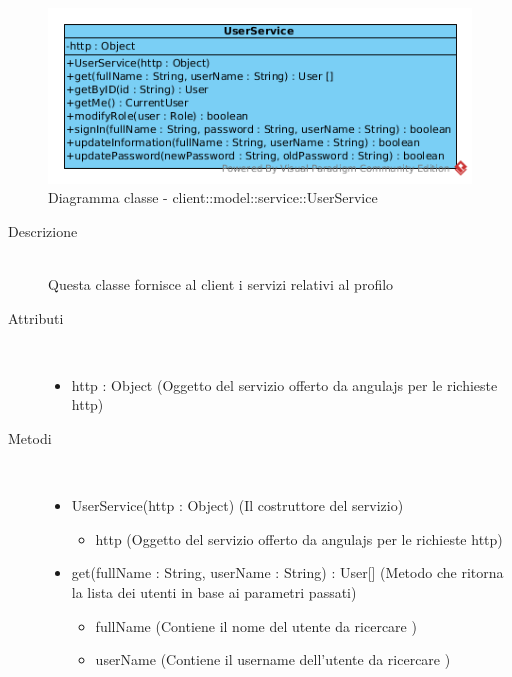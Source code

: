 \vspace{0.5cm}
\hypertarget{client::model::service::UserService}{}
\begin{center}
			\begin{figure}[H]
				\centering \includegraphics[scale=4, max width=\textwidth, max height=\myheight]{../img/diagrammiClassi/client/model/service/UserService.png}
				\caption{Diagramma classe - client::model::service::UserService}
			\end{figure}
		\end{center}\begin{description}
\item[Descrizione] \hfill \\
 Questa classe fornisce al client i servizi relativi al profilo 
\item[Attributi] \hfill \\
 \vspace{-7mm}
\begin{itemize}
\item http : Object (Oggetto del servizio offerto da angulajs per le richieste http)
\end{itemize}

\item[Metodi] \hfill \\
 \vspace{-7mm}
\begin{itemize}
\item UserService(http : Object) (Il costruttore del servizio)\begin{itemize}
\item http (Oggetto del servizio offerto da angulajs per le richieste http)
\end{itemize}

\item get(fullName : String, userName : String) : User[] (Metodo che ritorna la lista dei utenti in base ai parametri passati)\begin{itemize}
\item fullName (Contiene il nome del utente da ricercare )
\item userName (Contiene il username dell'utente da ricercare )
\end{itemize}


\end{itemize}
\end{description}
